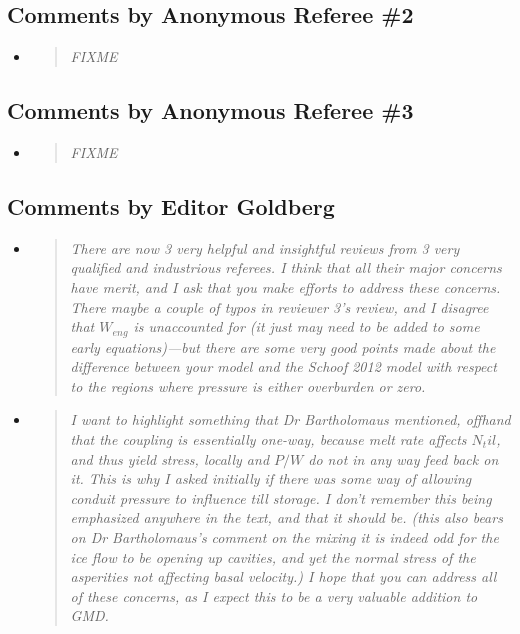 \documentclass[11pt,reqno]{amsart}
\newcommand{\reply}[2]{
\medskip\medskip
\item  \begin{quote}
\emph{#1}
\end{quote}

\medskip
\noindent #2}
\begin{document}
\subsection*{Comments by Anonymous Referee \#2}\begin{itemize}
\reply{FIXME}
{}

\end{itemize}



\subsection*{Comments by Anonymous Referee \#3}\begin{itemize}
\reply{FIXME}
{}

\end{itemize}



\subsection*{Comments by Editor Goldberg}\begin{itemize}
\reply{There are now 3 very helpful and insightful reviews from 3 very qualified and industrious
referees. I think that all their major concerns have merit, and I ask that you make efforts
to address these concerns. There maybe a couple of typos in reviewer 3's review, and
I disagree that $W_{eng}$ is unaccounted for (it just may need to be added to some early
equations)---but there are some very good points made about the difference between
your model and the Schoof 2012 model with respect to the regions where pressure is
either overburden or zero.}
{}

\reply{I want to highlight something that Dr Bartholomaus mentioned, offhand that the coupling is essentially one-way, because melt rate affects $N_til$, and thus yield stress, locally and $P/W$ do not in any way feed back on it. This is why I asked initially if there was
some way of allowing conduit pressure to influence till storage. I don't remember this
being emphasized anywhere in the text, and that it should be. (this also bears on Dr
Bartholomaus's comment on the mixing it is indeed odd for the ice flow to be opening
up cavities, and yet the normal stress of the asperities not affecting basal velocity.)
I hope that you can address all of these concerns, as I expect this to be a very valuable
addition to GMD.}
{}

\end{itemize}
\end{document}

